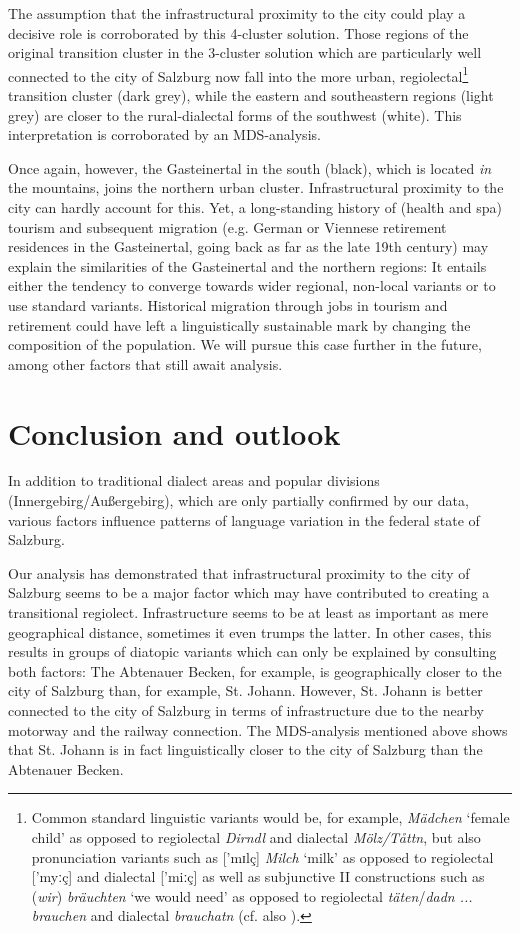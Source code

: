 \documentclass[output=paper,colorlinks, citecolor=brown]{langscibook}
\begin{document}
The assumption that the infrastructural proximity to the city could play a decisive role is corroborated by this 4-cluster solution. Those regions of the original transition cluster in the 3-cluster solution which are particularly well connected to the city of Salzburg now fall into the more urban, regiolectal\footnote{Common standard linguistic variants would be, for example, \textit{Mädchen} ‘female child’ as opposed to regiolectal \textit{Dirndl} and dialectal \textit{Mölz/Tåttn}, but also pronunciation variants such as [{}'mɪlç] \textit{Milch} ‘milk’ as opposed to regiolectal [{}'myːç] and dialectal [{}'miːç] as well as subjunctive II constructions such as (\textit{wir}) \textit{bräuchten} ‘we would need’ as opposed to regiolectal \textit{täten}/\textit{dadn ... brauchen} and dialectal \textit{brauchatn} (cf. also \citealt{NiehausEtAl2022}).} transition cluster (dark grey), while the eastern and southeastern regions (light grey) are closer to the rural-dialectal forms of the southwest (white). This interpretation is corroborated by an MDS-analysis.
\largerpage[2]

Once again, however, the Gasteinertal in the south (black), which is located \textit{in} the mountains, joins the northern urban cluster. Infrastructural proximity to the city can hardly account for this. Yet, a long-standing history of (health and spa) tourism and subsequent migration (e.g. German or Viennese retirement residences in the Gasteinertal, going back as far as the late 19th century) may explain the similarities of the Gasteinertal and the northern regions: It entails either the tendency to converge towards wider regional, non-local variants or to use standard variants. Historical migration through jobs in tourism and retirement could have left a linguistically sustainable mark by changing the composition of the population. We will pursue this case further in the future, among other factors that still await analysis. 

\section{Conclusion and outlook} \label{sec:blaßnigg:4}

In addition to traditional dialect areas and popular divisions (Innergebirg/Außer\-gebirg), which are only partially confirmed by our data, various factors influence patterns of language variation in the federal state of Salzburg.

Our analysis has demonstrated that infrastructural proximity to the city of Salzburg seems to be a major factor which may have contributed to creating a transitional regiolect. Infrastructure seems to be at least as important as mere geographical distance, sometimes it even trumps the latter. In other cases, this results in groups of diatopic variants which can only be explained by consulting both factors: The Abtenauer Becken, for example, is geographically closer to the city of Salzburg than, for example, St. Johann. However, St. Johann is better connected to the city of Salzburg in terms of infrastructure due to the nearby motorway and the railway connection. The MDS-analysis mentioned above shows that St. Johann is in fact linguistically closer to the city of Salzburg than the Abtenauer Becken.
\end{document}
